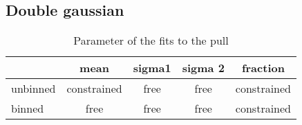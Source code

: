 \documentclass[41pt,a4paper,oneside]{report}
\begin{document}
%


\subsection{Double gaussian}
\label{sec:DoubleGauss}

\begin{table*}[bH]
\begin{center}
\caption{Parameter of the fits to the pull}
\begin{tabular}{l | c c c c }
\hline
         & mean & sigma1 & sigma 2 & fraction \\
\hline
unbinned &  constrained & free & free & constrained  \\
binned   &  free &  free  & free &  constrained \\
\hline
\hline
\end{tabular}
    \label{tab:ParamDoubleGFit}
\end{center}
\end{table*}
\end{document}
